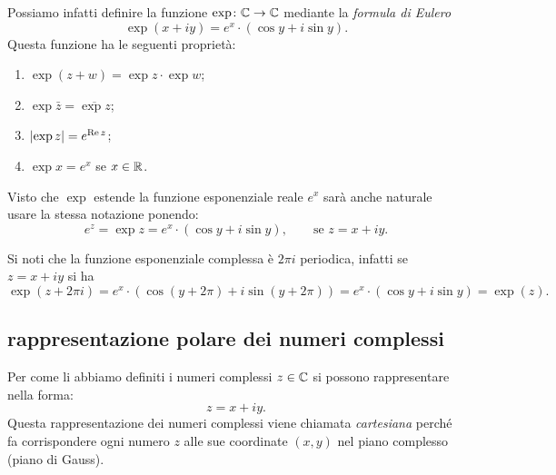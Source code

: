 Possiamo infatti definire la funzione $\exp \colon {\mathbb C} \to {\mathbb C}$ mediante 
la \emph{formula di Eulero}
\[
 \exp(x+iy) = e^x \cdot (\cos y + i \sin y).
\]
Questa funzione ha le seguenti proprietà:
\begin{enumerate}
  \item $\exp(z+w) = \exp z \cdot \exp w$;
  \item $\exp\bar z = \overline{\exp z}$;
  \item ${\left|\exp z\right|} = e^{\operatorname{Re} z}$;
  \item $\exp x = e^x$ se $x\in {\mathbb R}$.
\end{enumerate}
Visto che $\exp$ estende la funzione esponenziale reale $e^x$
sarà anche naturale usare la stessa notazione ponendo:
%
\[
  e^z = \exp z = e^x\cdot (\cos y + i\sin y), \qquad \text{se $z=x+iy$}.  
\]

Si noti che la funzione esponenziale complessa è $2\pi i$ periodica, infatti 
se $z=x+iy$ si ha 
\[
\exp(z+2\pi i) 
= e^x\cdot (\cos(y+2\pi) + i\sin(y+2\pi)) 
= e^x\cdot (\cos y + i \sin y) 
= \exp(z).
\]


\subsection{rappresentazione polare dei numeri complessi}

Per come li abbiamo definiti i numeri complessi $z\in {\mathbb C}$ si possono 
rappresentare nella forma:
\[
  z = x + i y.
\]
Questa rappresentazione dei numeri complessi viene chiamata \emph{cartesiana}
perché fa corrispondere ogni numero $z$ alle sue coordinate $(x,y)$ nel
piano complesso (piano di Gauss). 

